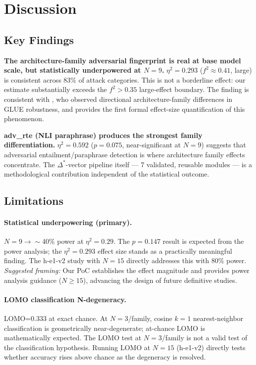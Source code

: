 \section{Discussion}
\label{sec:discussion}

\subsection{Key Findings}

\textbf{The architecture-family adversarial fingerprint is real at base model scale, but
statistically underpowered at $N=9$.} $\eta^2=0.293$ ($f^2 \approx 0.41$, large) is consistent
across 83\% of attack categories. This is not a borderline effect: our estimate substantially
exceeds the $f^2>0.35$ large-effect boundary. The finding is consistent with
\citet{Neerudu2023Robustness}, who observed directional architecture-family differences in GLUE
robustness, and provides the first formal effect-size quantification of this phenomenon.

\textbf{adv\_rte (NLI paraphrase) produces the strongest family differentiation.}
$\eta^2=0.592$ ($p=0.075$, near-significant at $N=9$) suggests that adversarial
entailment/paraphrase detection is where architecture family effects concentrate. The
$\Delta^*$-vector pipeline itself --- 7 validated, reusable modules --- is a methodological
contribution independent of the statistical outcome.

\subsection{Limitations}

\paragraph{Statistical underpowering (primary).}
$N=9 \to \sim$40\% power at $\eta^2=0.29$. The $p=0.147$ result is expected from the power
analysis; the $\eta^2=0.293$ effect size stands as a practically meaningful finding. The h-e1-v2
study with $N=15$ directly addresses this with 80\% power. \emph{Suggested framing:} Our PoC
establishes the effect magnitude and provides power analysis guidance ($N \geq 15$), advancing
the design of future definitive studies.

\paragraph{LOMO classification N-degeneracy.}
LOMO=0.333 at exact chance. At $N=3$/family, cosine $k=1$ nearest-neighbor classification is
geometrically near-degenerate; at-chance LOMO is mathematically expected. The LOMO test at
$N=3$/family is not a valid test of the classification hypothesis. Running LOMO at $N=15$
(h-e1-v2) directly tests whether accuracy rises above chance as the degeneracy is resolved.

